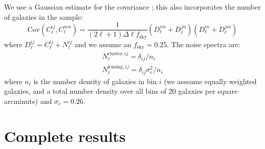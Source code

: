\documentclass[twocolumn,twocolappendix]{aastex63}
\begin{document}
We use a Gaussian estimate for the covariance \citep{takada_jain}; this also incorporates the number of galaxies in the
sample:
\begin{equation}
    \mathrm{Cov}(C^{ij}_\ell, C^{mn}_\ell) = \frac{1}{(2 \ell + 1)\Delta\ell f_\mathrm{sky}}(D^{im}_\ell + D^{jn}_\ell)(D^{in}_\ell + D^{jm}_\ell)
\end{equation}
where $D^{ij}_\ell = C^{ij}_\ell + N^{ij}_\ell$ and we assume an $f_\mathrm{sky}=0.25$.  The noise spectra are:
\begin{align}
N^{\mathrm{cluster},ij}_\ell = \delta_{ij} / n_i \\
N^{\mathrm{lensing},ij}_\ell = \delta_{ij} \sigma_e^2 / n_i
\end{align}
where $n_i$ is the number density of galaxies in bin $i$ (we asssume equally weighted galaxies, and a 
total number density over all bins of 20 galaxies per square arcminute) and $\sigma_e=0.26$.

\section{Complete results}
\label{sec:complete}
\end{document}
